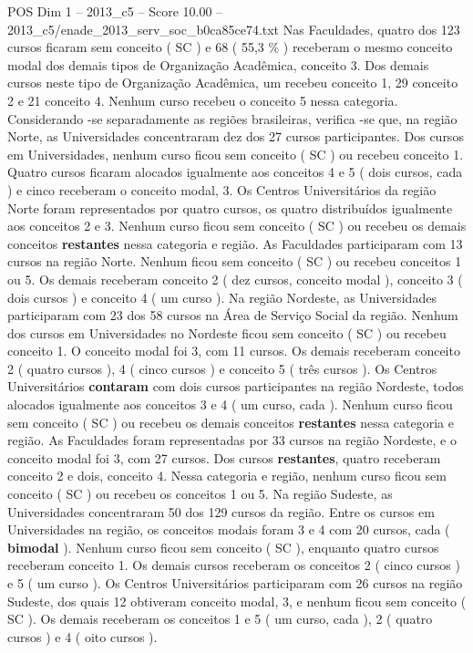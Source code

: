 \begin{textsample}{POS Dim 1 – 2013\_c5 – Score 10.00 – 2013\_c5/enade\_2013\_serv\_soc\_b0ca85ce74.txt}
Nas Faculdades, quatro dos 123 cursos ficaram sem conceito ( SC ) e 68 ( 55,3 \% ) receberam o mesmo conceito modal dos demais tipos de Organização Acadêmica, conceito 3.
Dos demais cursos neste tipo de Organização Acadêmica, um recebeu conceito 1, 29 conceito 2 e 21 conceito 4.
Nenhum curso recebeu o conceito 5 nessa categoria.
Considerando -se separadamente as regiões brasileiras, verifica -se que, na região Norte, as Universidades concentraram dez dos 27 cursos participantes.
Dos cursos em Universidades, nenhum curso ficou sem conceito ( SC ) ou recebeu conceito 1.
Quatro cursos ficaram alocados igualmente aos conceitos 4 e 5 ( dois cursos, cada ) e cinco receberam o conceito modal, 3.
Os Centros Universitários da região Norte foram representados por quatro cursos, os quatro distribuídos igualmente aos conceitos 2 e 3.
Nenhum curso ficou sem conceito ( SC ) ou recebeu os demais conceitos \textbf{restantes} nessa categoria e região.
As Faculdades participaram com 13 cursos na região Norte.
Nenhum ficou sem conceito ( SC ) ou recebeu conceitos 1 ou 5.
Os demais receberam conceito 2 ( dez cursos, conceito modal ), conceito 3 ( dois cursos ) e conceito 4 ( um curso ).
Na região Nordeste, as Universidades participaram com 23 dos 58 cursos na Área de Serviço Social da região.
Nenhum dos cursos em Universidades no Nordeste ficou sem conceito ( SC ) ou recebeu conceito 1.
O conceito modal foi 3, com 11 cursos.
Os demais receberam conceito 2 ( quatro cursos ), 4 ( cinco cursos ) e conceito 5 ( três cursos ).
Os Centros Universitários \textbf{contaram} com dois cursos participantes na região Nordeste, todos alocados igualmente aos conceitos 3 e 4 ( um curso, cada ).
Nenhum curso ficou sem conceito ( SC ) ou recebeu os demais conceitos \textbf{restantes} nessa categoria e região.
As Faculdades foram representadas por 33 cursos na região Nordeste, e o conceito modal foi 3, com 27 cursos.
Dos cursos \textbf{restantes}, quatro receberam conceito 2 e dois, conceito 4.
Nessa categoria e região, nenhum curso ficou sem conceito ( SC ) ou recebeu os conceitos 1 ou 5.
Na região Sudeste, as Universidades concentraram 50 dos 129 cursos da região.
Entre os cursos em Universidades na região, os conceitos modais foram 3 e 4 com 20 cursos, cada ( \textbf{bimodal} ).
Nenhum curso ficou sem conceito ( SC ), enquanto quatro cursos receberam conceito 1.
Os demais cursos receberam os conceitos 2 ( cinco cursos ) e 5 ( um curso ).
Os Centros Universitários participaram com 26 cursos na região Sudeste, dos quais 12 obtiveram conceito modal, 3, e nenhum ficou sem conceito ( SC ).
Os demais receberam os conceitos 1 e 5 ( um curso, cada ), 2 ( quatro cursos ) e 4 ( oito cursos ).

\end{textsample}
